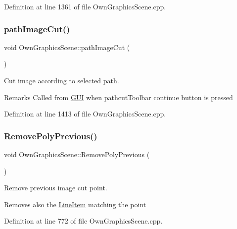 Definition at line 1361 of file Own\+Graphics\+Scene.\+cpp.

\mbox{\label{classOwnGraphicsScene_a0151f87fc7f7597fe91a99a83e261944}} 
\subsubsection{\texorpdfstring{path\+Image\+Cut()}{pathImageCut()}}
{\footnotesize\ttfamily void Own\+Graphics\+Scene\+::path\+Image\+Cut (\begin{DoxyParamCaption}{ }\end{DoxyParamCaption})}



Cut image according to selected path. 

\begin{DoxyRemark}{Remarks}
Called from \mbox{\hyperlink{classGUI}{G\+UI}} when pathcut\+Toolbar continue button is pressed 
\end{DoxyRemark}


Definition at line 1413 of file Own\+Graphics\+Scene.\+cpp.

\mbox{\label{classOwnGraphicsScene_a4976a8e6f682612acd3e23b6c98bd8d8}} 
\subsubsection{\texorpdfstring{Remove\+Poly\+Previous()}{RemovePolyPrevious()}}
{\footnotesize\ttfamily void Own\+Graphics\+Scene\+::\+Remove\+Poly\+Previous (\begin{DoxyParamCaption}{ }\end{DoxyParamCaption})}



Remove previous image cut point. 

Removes also the \mbox{\hyperlink{classLineItem}{Line\+Item}} matching the point 

Definition at line 772 of file Own\+Graphics\+Scene.\+cpp.

\mbox{\label{classOwnGraphicsScene_ae79aa179ce90ab26f06d7d17eed96b93}} 
